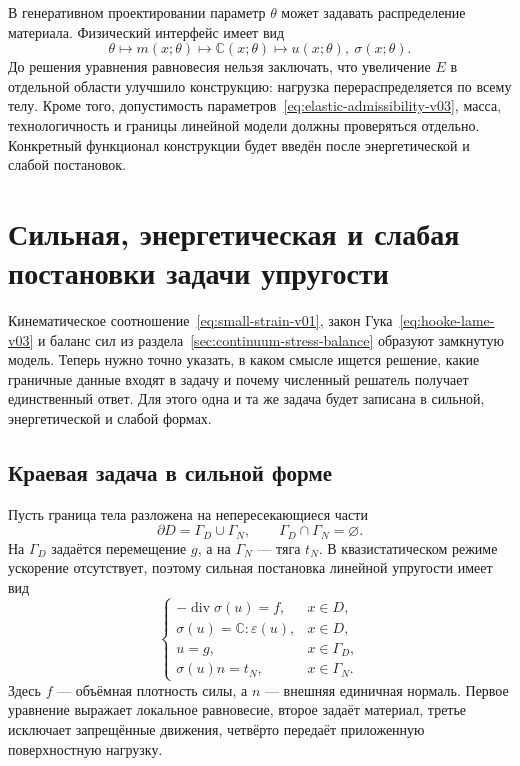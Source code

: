 В генеративном проектировании параметр $\theta$ может задавать распределение материала. Физический интерфейс имеет вид
\begin{equation}
\label{eq:generative-material-contract-v03}
 \theta
 \longmapsto
 m(x;\theta)
 \longmapsto
 \mathbb{C}(x;\theta)
 \longmapsto
 u(x;\theta),\ \sigma(x;\theta).
\end{equation}
До решения уравнения равновесия нельзя заключать, что увеличение $E$ в отдельной области улучшило конструкцию: нагрузка перераспределяется по всему телу. Кроме того, допустимость параметров~\eqref{eq:elastic-admissibility-v03}, масса, технологичность и границы линейной модели должны проверяться отдельно. Конкретный функционал конструкции будет введён после энергетической и слабой постановок.
\section{Сильная, энергетическая и слабая постановки задачи упругости}
\label{sec:elasticity-variational-formulation}

Кинематическое соотношение~\eqref{eq:small-strain-v01}, закон Гука~\eqref{eq:hooke-lame-v03} и баланс сил из раздела~\ref{sec:continuum-stress-balance} образуют замкнутую модель. Теперь нужно точно указать, в каком смысле ищется решение, какие граничные данные входят в задачу и почему численный решатель получает единственный ответ. Для этого одна и та же задача будет записана в сильной, энергетической и слабой формах.

\subsection{Краевая задача в сильной форме}

Пусть граница тела разложена на непересекающиеся части
\begin{equation}
\label{eq:boundary-split-v04}
 \partial D=\Gamma_D\cup\Gamma_N,
 \qquad
 \Gamma_D\cap\Gamma_N=\varnothing.
\end{equation}
На $\Gamma_D$ задаётся перемещение $g$, а на $\Gamma_N$ --- тяга $t_N$. В квазистатическом режиме ускорение отсутствует, поэтому сильная постановка линейной упругости имеет вид
\begin{equation}
\label{eq:strong-elasticity-v04}
\begin{cases}
 -\operatorname{div}\sigma(u)=f,&x\in D,\\
 \sigma(u)=\mathbb C:\varepsilon(u),&x\in D,\\
 u=g,&x\in\Gamma_D,\\
 \sigma(u)n=t_N,&x\in\Gamma_N.
\end{cases}
\end{equation}
Здесь $f$ --- объёмная плотность силы, а $n$ --- внешняя единичная нормаль. Первое уравнение выражает локальное равновесие, второе задаёт материал, третье исключает запрещённые движения, четвёрто передаёт приложенную поверхностную нагрузку.

